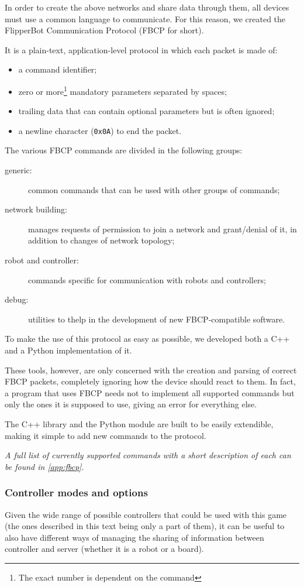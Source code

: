 In order to create the above networks and share data through them,
all devices must use a common language to communicate.
For this reason, we created the FlipperBot Communication Protocol
(FBCP for short).

\beforelist It is a plain-text, application-level protocol in which each packet
is made of:
\begin{itemize}
  \item a command identifier;
  \item zero or more\footnote{The exact number is dependent on the
    command} mandatory parameters separated by spaces;
  \item trailing data that can contain optional parameters but is
    often ignored;
  \item a newline character (\texttt{0x0A}) to end the packet.
\end{itemize}
\afterlist*
\beforelist The various FBCP commands are divided in the following groups:
\begin{description}
  \item[generic:] common commands that can be used with
    other groups of commands;
  \item[network building:] manages requests of permission to
    join a network and grant/denial of it, in addition to changes of
    network topology;
  \item[robot and controller:] commands specific
    for communication with robots and controllers;
  \item[debug:] utilities to thelp in the development of new
    FBCP-compatible software.
\end{description}
\afterlist*
To make the use of this protocol as easy as possible, we developed both
a C++ and a Python implementation of it.

These tools, however, are only concerned with the creation and
parsing of correct FBCP packets, completely ignoring how the device
should react to them. In fact, a program that uses FBCP needs not to
implement all supported commands but only the ones it is supposed to
use, giving an error for everything else.

The C++ library and the Python module are built to be easily
extendible, making it simple to add new commands to the protocol.

\textit{A full list of currently supported commands with a short
description of each can be found in \autoref{app:fbcp}.}

\subsubsection{Controller modes and options}
  \label{sssec:optmode}
  Given the wide range of possible controllers that could be used
  with this game (the ones described in this text being only a part
  of them), it can be useful to also have different ways of managing
  the sharing of information between controller and server (whether
  it is a robot or a board).

